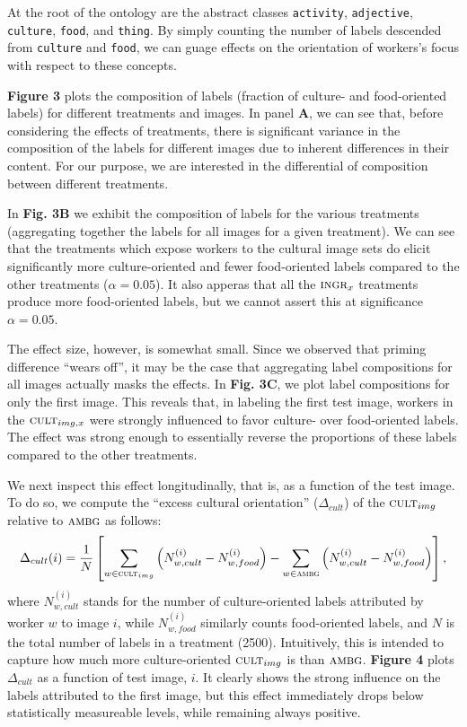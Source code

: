 \documentclass[a4paper]{report}
\begin{document}
At the root of the ontology are the abstract classes \texttt{activity}, 
\texttt{adjective}, \texttt{culture}, \texttt{food}, and \texttt{thing}.
By simply counting the number of labels descended from \texttt{culture}
and \texttt{food}, we can guage effects on the orientation of workers's focus
with respect to these concepts.

\textbf{Figure 3} plots the composition of labels (fraction of culture- and 
food-oriented labels) for different treatments and images.  In 
panel \textbf{A}, we can see that, before considering the effects of 
treatments, there is significant variance in the composition of the labels 
for different images due to inherent differences in their content.  For our 
purpose, we are interested in the differential of composition between 
different treatments.

In \textbf{Fig. 3B} we exhibit the composition of labels for the various 
treatments (aggregating together the labels for all images for a given 
treatment).  We can see that the treatments which expose workers to the
cultural image sets do elicit significantly more culture-oriented and fewer
food-oriented labels compared to the other treatments ($\alpha=0.05$).  It 
also apperas that all the $\textsc{ingr}_x$ treatments produce more 
food-oriented labels, but we cannot assert this at significance 
$\alpha = 0.05$. 

The effect size, however, is somewhat small.  Since we observed that priming 
difference ``wears off'', it may be the case 
that aggregating label compositions for all images actually masks the effects. 
In \textbf{Fig. 3C}, we plot label compositions for only the first
image.  This reveals that, in labeling the first test image, workers in the
$\textsc{cult}_{img,x}$ were strongly influenced to favor culture- over 
food-oriented labels.  The effect was strong enough to essentially reverse 
the proportions of these labels compared to the other treatments.

We next inspect this effect longitudinally, that is, as a function of 
the test image.  To do so, we compute the ``excess cultural orientation'' 
($\Delta_{cult}$) of
the $\textsc{cult}_{img}$ relative to $\textsc{ambg}$ as follows: 
\begin{align}
	\Delta_{cult}(i) = \frac{1}{N}\left[ \sum_{w\in\textsc{cult}_{img}} \left(N_{w,cult}^{(i)} - N_{w,food}^{(i)}\right)
	- \sum_{w\in\textsc{ambg}} \left(N_{w,cult}^{(i)} - N_{w,food}^{(i)}\right)\right],
\end{align}
where $N_{w,cult}^{(i)}$ stands for the number of culture-oriented labels 
attributed by worker $w$ to image $i$, while $N_{w,food}^{(i)}$ similarly 
counts food-oriented labels, and $N$ is the total number of labels in a 
treatment (2500).  
Intuitively, this is intended to capture how much 
more culture-oriented $\textsc{cult}_{img}$ is than $\textsc{ambg}$.  
\textbf{Figure 4} plots $\Delta_{cult}$ as a function of test image, $i$. It
clearly shows the strong influence on the labels attributed to the first image,
but this effect immediately drops below statistically measureable levels, while
remaining always positive.
\end{document}
